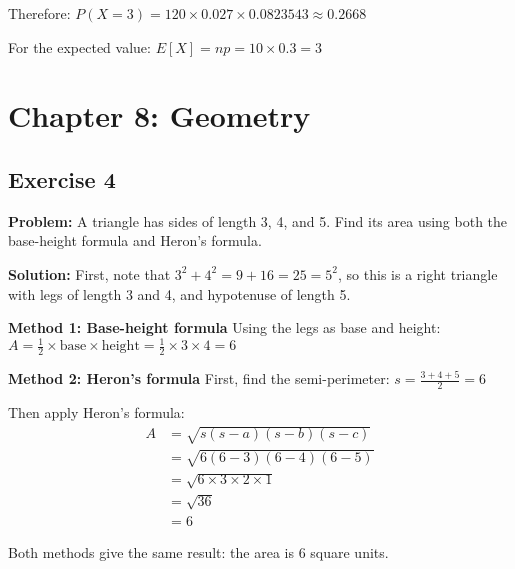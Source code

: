 Therefore:
$P(X = 3) = 120 \times 0.027 \times 0.0823543 \approx 0.2668$

For the expected value:
$E[X] = np = 10 \times 0.3 = 3$

\section{Chapter 8: Geometry}

\subsection{Exercise 4}
\textbf{Problem:} A triangle has sides of length 3, 4, and 5. Find its area using both the base-height formula and Heron's formula.

\textbf{Solution:}
First, note that $3^2 + 4^2 = 9 + 16 = 25 = 5^2$, so this is a right triangle with legs of length 3 and 4, and hypotenuse of length 5.

\textbf{Method 1: Base-height formula}
Using the legs as base and height:
$A = \frac{1}{2} \times \text{base} \times \text{height} = \frac{1}{2} \times 3 \times 4 = 6$

\textbf{Method 2: Heron's formula}
First, find the semi-perimeter:
$s = \frac{3 + 4 + 5}{2} = 6$

Then apply Heron's formula:
\begin{align}
A &= \sqrt{s(s-a)(s-b)(s-c)} \\
&= \sqrt{6(6-3)(6-4)(6-5)} \\
&= \sqrt{6 \times 3 \times 2 \times 1} \\
&= \sqrt{36} \\
&= 6
\end{align}

Both methods give the same result: the area is 6 square units.

